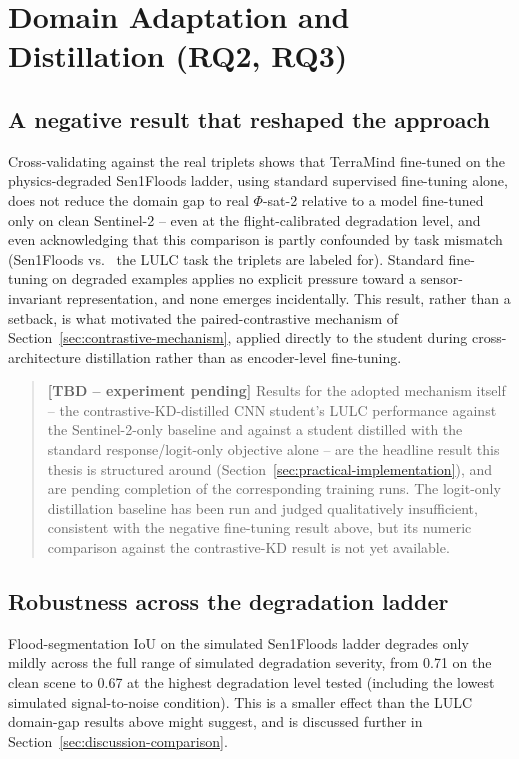 \section{Domain Adaptation and Distillation (RQ2, RQ3)}
\label{sec:rq3-results}

\subsection{A negative result that reshaped the approach}

Cross-validating against the real triplets shows that TerraMind fine-tuned on the physics-degraded Sen1Floods ladder, using standard supervised fine-tuning alone, does not reduce the domain gap to real $\Phi$-sat-2 relative to a model fine-tuned only on clean Sentinel-2 -- even at the flight-calibrated degradation level, and even acknowledging that this comparison is partly confounded by task mismatch (Sen1Floods vs.
\ the LULC task the triplets are labeled for).
Standard fine-tuning on degraded examples applies no explicit pressure toward a sensor-invariant representation, and none emerges incidentally.
This result, rather than a setback, is what motivated the paired-contrastive mechanism of Section~\ref{sec:contrastive-mechanism}, applied directly to the student during cross-architecture distillation rather than as encoder-level fine-tuning.

\begin{quote}
    \textbf{[TBD -- experiment pending]}
    Results for the adopted mechanism itself -- the contrastive-KD-distilled CNN student's LULC performance against the Sentinel-2-only baseline and against a student distilled with the standard response/logit-only objective alone -- are the headline result this thesis is structured around (Section~\ref{sec:practical-implementation}), and are pending completion of the corresponding training runs.
    The logit-only distillation baseline has been run and judged qualitatively insufficient, consistent with the negative fine-tuning result above, but its numeric comparison against the contrastive-KD result is not yet available.
\end{quote}

\subsection{Robustness across the degradation ladder}

Flood-segmentation IoU on the simulated Sen1Floods ladder degrades only mildly across the full range of simulated degradation severity, from 0.71 on the clean scene to 0.67 at the highest degradation level tested (including the lowest simulated signal-to-noise condition).
This is a smaller effect than the LULC domain-gap results above might suggest, and is discussed further in Section~\ref{sec:discussion-comparison}.

